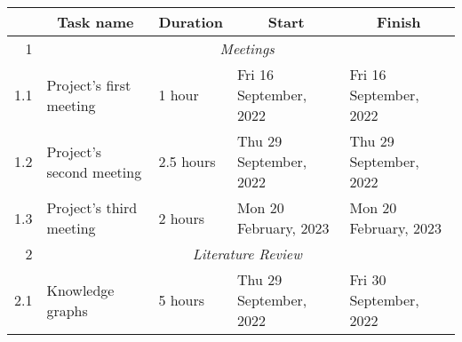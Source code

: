 \documentclass{standalone}
\begin{document}
\begin{tabular}{|r|llll|}
    \hline
    \rowcolor[HTML]{C0C0C0}
    \multicolumn{1}{|c|}{\cellcolor[HTML]{C0C0C0}\textbf{ID}}     & \multicolumn{1}{c|}{\cellcolor[HTML]{C0C0C0}\textbf{Task name}} & \multicolumn{1}{c|}{\cellcolor[HTML]{C0C0C0}\textbf{Duration}} & \multicolumn{1}{c|}{\cellcolor[HTML]{C0C0C0}\textbf{Start}} & \multicolumn{1}{c|}{\cellcolor[HTML]{C0C0C0}\textbf{Finish}} \\ \hline
    1                                                             & \multicolumn{4}{c|}{\textit{Meetings}}                                                                                                                                                                                                                        \\ \hline
    1.1                                                           & \multicolumn{1}{l|}{Project's first meeting}                    & \multicolumn{1}{l|}{1 hour}                                    & \multicolumn{1}{l|}{Fri 16 September, 2022}                 & Fri 16 September, 2022                                       \\ \hline
    1.2                                                           & \multicolumn{1}{l|}{Project's second meeting}                   & \multicolumn{1}{l|}{2.5 hours}                                 & \multicolumn{1}{l|}{Thu 29 September, 2022}                 & Thu 29 September, 2022                                       \\ \hline
    1.3                                                           & \multicolumn{1}{l|}{Project's third meeting}                    & \multicolumn{1}{l|}{2 hours}                                   & \multicolumn{1}{l|}{Mon 20 February, 2023}                  & Mon 20 February, 2023                                        \\ \hline
    2                                                             & \multicolumn{4}{c|}{\textit{Literature Review}}                                                                                                                                                                                                               \\ \hline
    2.1                                                           & \multicolumn{1}{l|}{Knowledge graphs}                           & \multicolumn{1}{l|}{5 hours}                                   & \multicolumn{1}{l|}{Thu 29 September, 2022}                 & Fri 30 September, 2022                                       \\ \hline

\end{tabular}
\end{document}
